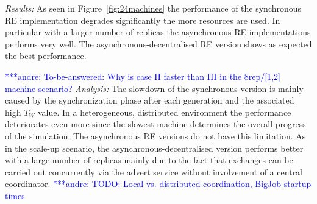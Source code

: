 \documentclass{rspublic}
\newcommand{\alnote}[1]{ {\textcolor{blue} { ***andre: #1 }}}
\newcommand{\alnote}[1]{}
\begin{document}
{{\it Results:} As seen in Figure~\ref{fig:24machines} the performance of the 
synchronous RE implementation degrades significantly the more resources are used.
In particular with a larger number of replicas the asynchronous RE implementations
performs very well. The asynchronous-decentralised RE version shows as expected
the best performance.

\alnote{To-be-answered: Why is case II faster than III 
in the 8rep/[1,2] machine scenario?}
{\it Analysis: } The slowdown of the synchronous version is mainly
caused by the synchronization phase after each generation and the associated 
high $T_{W}$ value. In a heterogeneous, distributed environment the performance
deteriorates even more since the slowest machine determines the overall progress of
the simulation. The asynchronous RE versions do not have this limitation. As in
the scale-up scenario, the asynchronous-decentralised version performs
better with a large number of replicas mainly due to the fact that exchanges
can be carried out concurrently via the advert service without 
involvement of a central coordinator.
\alnote{TODO: Local vs. distributed coordination, BigJob startup times}






}
\end{document}
